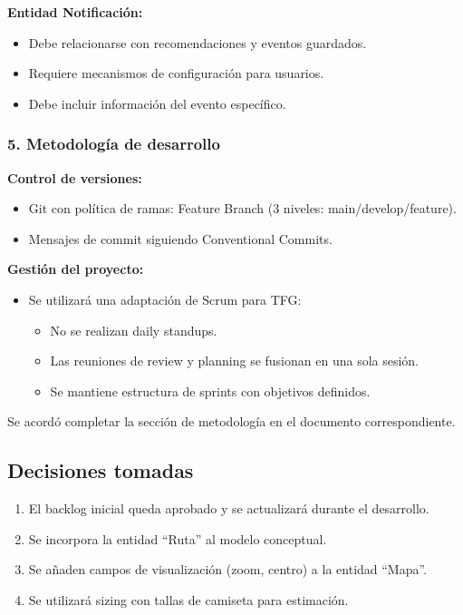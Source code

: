 \textbf{Entidad Notificación:}
\begin{itemize}
    \item Debe relacionarse con recomendaciones y eventos guardados.
    \item Requiere mecanismos de configuración para usuarios.
    \item Debe incluir información del evento específico.
\end{itemize}

\subsubsection*{5. Metodología de desarrollo}

\textbf{Control de versiones:}
\begin{itemize}
    \item Git con política de ramas: Feature Branch (3 niveles: main/develop/feature).
    \item Mensajes de commit siguiendo Conventional Commits.
\end{itemize}

\textbf{Gestión del proyecto:}
\begin{itemize}
    \item Se utilizará una adaptación de Scrum para TFG:
    \begin{itemize}
        \item No se realizan daily standups.
        \item Las reuniones de review y planning se fusionan en una sola sesión.
        \item Se mantiene estructura de sprints con objetivos definidos.
    \end{itemize}
\end{itemize}

Se acordó completar la sección de metodología en el documento correspondiente.

\subsection*{Decisiones tomadas}
\begin{enumerate}
    \item El backlog inicial queda aprobado y se actualizará durante el desarrollo.
    \item Se incorpora la entidad ``Ruta'' al modelo conceptual.
    \item Se añaden campos de visualización (zoom, centro) a la entidad ``Mapa''.
    \item Se utilizará sizing con tallas de camiseta para estimación.
\end{enumerate}


